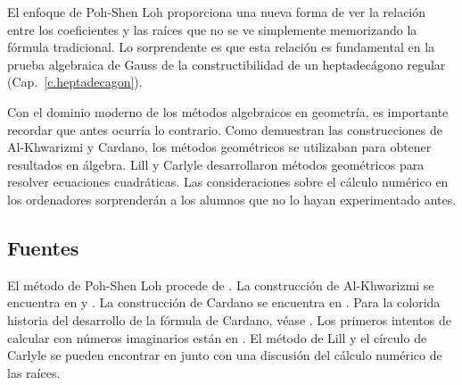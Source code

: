 El enfoque de Poh-Shen Loh proporciona una nueva forma de ver la relación entre los coeficientes y las raíces que no se ve simplemente memorizando la fórmula tradicional. Lo sorprendente es que esta relación es fundamental en la prueba algebraica de Gauss de la constructibilidad de un heptadecágono regular (Cap.~\ref{c.heptadecagon}).

Con el dominio moderno de los métodos algebraicos en geometría, es importante recordar que antes ocurría lo contrario. Como demuestran las construcciones de Al-Khwarizmi y Cardano, los métodos geométricos se utilizaban para obtener resultados en álgebra. Lill y Carlyle desarrollaron métodos geométricos para resolver ecuaciones cuadráticas. Las consideraciones sobre el cálculo numérico en los ordenadores sorprenderán a los alumnos que no lo hayan experimentado antes.

\subsection*{Fuentes}

El método de Poh-Shen Loh procede de \cite{loh1,loh2}. La construcción de Al-Khwarizmi se encuentra en \cite[Cap.~1]{jorg} y \cite{mastin}. La construcción de Cardano se encuentra en \cite[Cap.~1]{jorg}. Para la colorida historia del desarrollo de la fórmula de Cardano, véase \cite{wiki:cardano}. Los primeros intentos de calcular con números imaginarios están en \cite[Cap.~2]{jorg}. El método de Lill y el círculo de Carlyle se pueden encontrar en \cite{wiki:quadratic} junto con una discusión del cálculo numérico de las raíces.
